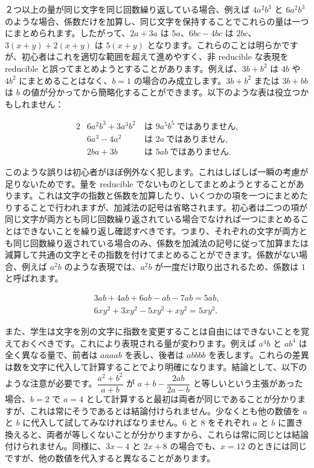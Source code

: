 \documentclass[a4paper,11pt,openany]{ltjsbook}
\begin{document}
２つ以上の量が同じ文字を同じ回数繰り返している場合、例えば $4a^{2} b^{3}$ と $6a^{2} b^{3}$ のような場合、係数だけを加算し、同じ文字を保持することでこれらの量は一つにまとめられます。したがって、$2a + 3a$ は $5a$、$6bc - 4bc$ は $2bc$、$3(x + y) + 2(x + y)$ は $5(x + y)$ となります。これらのことは明らかですが、初心者はこれを適切な範囲を超えて進めやすく、非 reducible な表現を reducible と誤ってまとめようとすることがあります。例えば、$3b + b^{2}$ は $4b$ や $4b^{2}$ にまとめることはなく、$b = 1$ の場合のみ成立します。$3b + b^{2}$ または $3b + bb$ は $b$ の値が分かってから簡略化することができます。以下のような表は役立つかもしれません：

\begin{alignat*}{2}
&6a^{2} b^{3} + 3a^{3} b^{2}\ &\text{は }9a^{5} b^{5}\ \text{ではありません,}\\
&6a^{3} - 4a^{2}\ &\text{は }2a\ \text{ではありません,}\\
&2ba + 3b\ &\text{は }5ab\ \text{ではありません.}
\end{alignat*}

このような誤りは初心者がほぼ例外なく犯します。これはしばしば一瞬の考慮が足りないためです。量を reducible でないものとしてまとめようとすることがあります。これは文字の指数と係数を加算したり、いくつかの項を一つにまとめたりすることで行われますが、加減法の記号は省略されます。初心者は二つの項が同じ文字が両方とも同じ回数繰り返されている場合でなければ一つにまとめることはできないことを繰り返し確認すべきです。つまり、それぞれの文字が両方とも同じ回数繰り返されている場合のみ、係数を加減法の記号に従って加算または減算して共通の文字とその指数を付けてまとめることができます。係数がない場合、例えば $a^{2} b$ のような表現では、$a^{2} b$ が一度だけ取り出されるため、係数は $1$ と呼ばれます。

\begin{gather*}
3ab + 4ab + 6ab - ab -7ab = 5ab, \\
6xy^{2} + 3xy^{2} - 5xy^{2} + xy^{2} = 5xy^{2}.
\end{gather*}

また、学生は文字を別の文字に指数を変更することは自由にはできないことを覚えておくべきです。これにより表現される量が変わります。例えば $a^{4} b$ と $ab^{4}$ は全く異なる量で、前者は $aaaab$ を表し、後者は $abbbb$ を表します。これらの差異は数を文字に代入して計算することでより明確になります。結論として、以下のような注意が必要です。$\dfrac{a^{2} + b^{2}}{a + b}$ が $a + b - \dfrac{2ab}{2a - b}$ と等しいという主張があった場合、$b = 2$ で $a = 4$ として計算すると最初は両者が同じであることが分かりますが、これは常にそうであるとは結論付けられません。少なくとも他の数値を $a$ と $b$ に代入して試してみなければなりません。$6$ と $8$ をそれぞれ $a$ と $b$ に置き換えると、両者が等しくないことが分かりますから、これらは常に同じとは結論付けられません。同様に、$3x - 4$ と $2x + 8$ の場合でも、$x = 12$ のときには同じですが、他の数値を代入すると異なることがあります。
\end{document}
